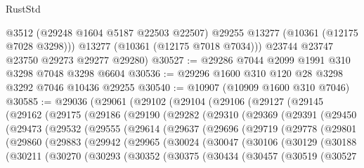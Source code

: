 \begin{lexlean}{RustStd}
\begin{coremodule}
          @3512
          (@29248 @1604 @5187 @22503 @22507)
          @29255
          @13277
          (@10361 (@12175 @7028 @3298)))
        @13277
        (@10361 (@12175 @7018 @7034)))
      @23744
      @23747
      @23750
      @29273
      @29277
      @29280)
@30527 := @29286 @7044 @2099 @1991 @310 @3298 @7048 @3298 @6604
@30536 := @29296 @1600 @310 @120 @28 @3298 @3292 @7046 @10436 @29255
@30540 := @10907 (@10909 @1600 @310 @7046)
@30585 := @29036
    (@29061
      (@29102
        (@29104
          (@29106
            (@29127
              (@29145
                (@29162
                  (@29175
                    (@29186
                      (@29190
                        (@29282
                          (@29310
                            (@29369
                              (@29391
                                (@29450
                                  (@29473
                                    (@29532
                                      (@29555
                                        (@29614
                                          (@29637
                                            (@29696
                                              (@29719
                                                (@29778
                                                  (@29801
                                                    (@29860
                                                      (@29883
                                                        (@29942
                                                          (@29965
                                                            (@30024
                                                              (@30047
                                                                (@30106
                                                                  (@30129
                                                                    (@30188
                                                                      (@30211
                                                                        (@30270
                                                                          (@30293
                                                                            (@30352
                                                                              (@30375
                                                                                (@30434
                                                                                  (@30457
                                                                                    (@30519
                                                                                      (@30527

\end{coremodule}
\end{lexlean}
